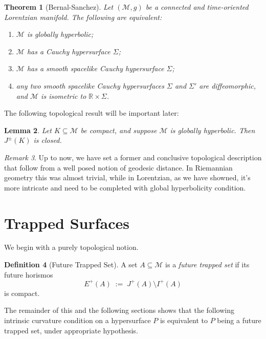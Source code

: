 \documentclass[12pt, a4paper]{article}
\theoremstyle{plain}
\newtheorem{theorem}{Theorem}[section]
\newtheorem{lemma}[theorem]{Lemma}
\theoremstyle{definition}
\newtheorem{definition}[theorem]{Definition}
\theoremstyle{remark}
\newtheorem{remark}[theorem]{Remark}
\newcommand{\M}{\mathcal{M}}
\begin{document}
\begin{theorem}[Bernal-Sanchez]
\label{thm:geroch}
  Let $(\M, g)$ be a connected and time-oriented Lorentzian manifold. The
  following are equivalent:
  \begin{enumerate}
    \item $\M$ is globally hyperbolic;
    \item $\M$ has a Cauchy hypersurface $\Sigma$;
    \item $\M$ has a smooth spacelike Cauchy hypersurface $\Sigma$;
    \item any two smooth spacelike Cauchy hypersurfaces $\Sigma$ and $\Sigma'$
          are diffeomorphic, and $\M$ is isometric to $\mathbb{R} \times \Sigma$.
  \end{enumerate}
\end{theorem}

The following topological result will be important later:

\begin{lemma}
\label{lem:compact-causal-future}
  Let $K \subseteq \M$ be compact, and suppose $\M$ is globally hyperbolic.
  Then $J^{\pm}(K)$ is closed.
\end{lemma}

\begin{remark}
    Up to now, we have set a former and conclusive topological description that follow from a well posed notion of geodesic distance. In Riemannian geometry this was almost trivial, while in Lorentzian, as we have showned, it's more intricate and need to be completed with global hyperbolicity condition. 
\end{remark}


\section{Trapped Surfaces}

We begin with a purely topological notion.

\begin{definition}[Future Trapped Set]
  A set $A \subseteq \M$ is a \emph{future trapped set} if its future horismos
  \[
    E^{+}(A) \;:=\; J^{+}(A) \setminus I^{+}(A) 
  \]
  is compact.
\end{definition}

The remainder of this and the following sections shows that the following intrinsic curvature condition on a hypersurface $P$ is equivalent to $P$ being a future trapped set, under appropriate hypothesis.
\end{document}
